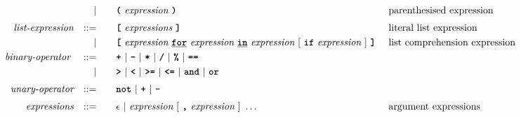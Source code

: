 \begin{alignat*}{9}
&&                       && |   &\quad &&  \textbf{\texttt{(}}\  \textit{expression} \ 
                                            \textbf{\texttt{)}} && \textrm{parenthesised expression}\\[1mm]
&& \textit{list-expression}   && ::= &\quad &&   \textbf{\texttt{[}}\ \textit{expressions}\
                                            \textbf{\texttt{]}}
                                                           && \textrm{literal list expression}\\
&&                       && |   &\quad &&   \textbf{\texttt{[}}\ \textit{expression} \     \textbf{\texttt{\underline{for}}} \ \textit{expression} \ \textbf{\texttt{\underline{in}}} \
                                            \textit{expression} \ [ \ \textbf{\texttt{if}} \ \textit{expression} \ ]  \ \textbf{\texttt{]}} \ && \textrm{list comprehension expression}\\
&& \textit{binary-operator}    \ 
                        && ::= &\quad && \textbf{\texttt{+}}\ |\ \textbf{\texttt{-}}\ |\ \textbf{\texttt{*}}\ |\ \textbf{\texttt{/}}\ |\ \textbf{\texttt{\%}}\ |\ 
                                   \textbf{\texttt{==}}\ \\ %
&&                       && |  &\quad &&  \texttt{\textbf{>}}\ |\ \texttt{\textbf{<}}\ |\ \texttt{\textbf{>=}}\ |\ \texttt{\textbf{<=}}\
                                          |\ \textbf{\texttt{and}}\ |\ \texttt{\textbf{or}}\  \\[1mm]
&& \textit{unary-operator}    
                        && ::= &\quad && \textbf{\texttt{not}}\ |\ \textbf{\texttt{+}}\ |\ \textbf{\texttt{-}} \\[1mm]
&& \textit{expressions}  && ::= &\quad && \epsilon\ | \ \textit{expression}\ [
                                                               \ \textbf{\texttt{,}} \
                                                                 \textit{expression} \ 
                                                                      ]\ \ldots
                                                            && \textrm{argument expressions}
\end{alignat*}

\newpage